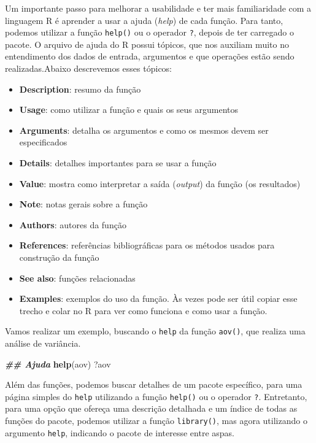 \documentclass[
]{article}
\newenvironment{Shaded}{\begin{snugshade}}{\end{snugshade}}
\newcommand{\DocumentationTok}[1]{\textcolor[rgb]{0.56,0.35,0.01}{\textbf{\textit{#1}}}}
\newcommand{\FunctionTok}[1]{\textcolor[rgb]{0.13,0.29,0.53}{\textbf{#1}}}
\newcommand{\NormalTok}[1]{#1}
\providecommand{\tightlist}{%
  \setlength{\itemsep}{0pt}\setlength{\parskip}{0pt}}
\begin{document}
Um importante passo para melhorar a usabilidade e ter mais familiaridade com a linguagem R é aprender a usar a ajuda (\emph{help}) de cada função. Para tanto, podemos utilizar a função \texttt{help()} ou o operador \texttt{?}, depois de ter carregado o pacote. O arquivo de ajuda do R possui tópicos, que nos auxiliam muito no entendimento dos dados de entrada, argumentos e que operações estão sendo realizadas.Abaixo descrevemos esses tópicos:

\begin{itemize}
\tightlist
\item
  \textbf{Description}: resumo da função
\item
  \textbf{Usage}: como utilizar a função e quais os seus argumentos
\item
  \textbf{Arguments}: detalha os argumentos e como os mesmos devem ser especificados
\item
  \textbf{Details}: detalhes importantes para se usar a função
\item
  \textbf{Value}: mostra como interpretar a saída (\emph{output}) da função (os resultados)
\item
  \textbf{Note}: notas gerais sobre a função
\item
  \textbf{Authors}: autores da função
\item
  \textbf{References}: referências bibliográficas para os métodos usados para construção da função
\item
  \textbf{See also}: funções relacionadas
\item
  \textbf{Examples}: exemplos do uso da função. Às vezes pode ser útil copiar esse trecho e colar no R para ver como funciona e como usar a função.
\end{itemize}

Vamos realizar um exemplo, buscando o \texttt{help} da função \texttt{aov()}, que realiza uma análise de variância.

\begin{Shaded}
\begin{Highlighting}[]
\DocumentationTok{\#\# Ajuda}
\FunctionTok{help}\NormalTok{(aov)}
\NormalTok{?aov}
\end{Highlighting}
\end{Shaded}

Além das funções, podemos buscar detalhes de um pacote específico, para uma página simples do \texttt{help} utilizando a função \texttt{help()} ou o operador \texttt{?}. Entretanto, para uma opção que ofereça uma descrição detalhada e um índice de todas as funções do pacote, podemos utilizar a função \texttt{library()}, mas agora utilizando o argumento \texttt{help}, indicando o pacote de interesse entre aspas.
\end{document}
